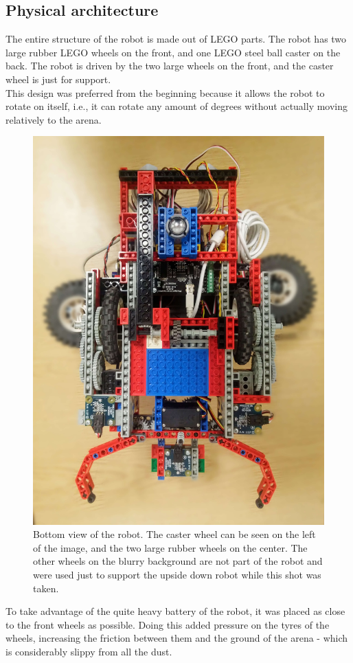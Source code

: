 \subsection{Physical architecture}

The entire structure of the robot is made out of LEGO parts. The robot has two large rubber LEGO wheels on the front, and one LEGO steel ball caster on the back. The robot is driven by the two large wheels on the front, and the caster wheel is just for support.\\
This design was preferred from the beginning because it allows the robot to rotate on itself, i.e., it can rotate any amount of degrees without actually moving relatively to the arena.

\clearpage

\begin{figure}[ht]
    \centering
    \includegraphics[height=0.8\linewidth, angle=90]{res/robot-pics/view-bottom.jpg}
    \caption{
        Bottom view of the robot. The caster wheel can be seen on the left of the image, and the two large rubber wheels on the center. The other wheels on the blurry background are not part of the robot and were used just to support the upside down robot while this shot was taken.
    }
\end{figure}

To take advantage of the quite heavy battery of the robot, it was placed as close to the front wheels as possible. Doing this added pressure on the tyres of the wheels, increasing the friction between them and the ground of the arena - which is considerably slippy from all the dust.


